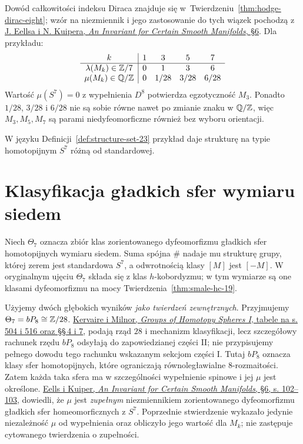 Dowód całkowitości indeksu Diraca znajduje się
w~Twierdzeniu~\ref{thm:hodge-dirac-eight};
wzór na niezmiennik i jego zastosowanie
do tych wiązek pochodzą z
\href{https://webhomes.maths.ed.ac.uk/~v1ranick/papers/eelskuip.pdf}
{J. Eellsa i N. Kuipera,
\emph{An Invariant for Certain Smooth
Manifolds}, §6}. Dla przykładu:
\[
\begin{array}{c|cccc}
 k&1&3&5&7\\ \hline
 \lambda(M_k)\in\mathbb{Z}/7&0&1&3&6\\
 \mu(M_k)\in\mathbb{Q}/\mathbb{Z}&0&1/28&3/28&6/28
\end{array}
\]
Wartość $\mu(S^7)=0$ z wypełnienia
$D^8$ potwierdza egzotyczność $M_3$.
Ponadto $1/28$, $3/28$ i $6/28$
nie są sobie równe nawet po zmianie
znaku w $\mathbb{Q}/\mathbb{Z}$, więc $M_3,M_5,M_7$
są parami niedyfeomorficzne również
bez wyboru orientacji.

W języku
Definicji~\ref{def:structure-set-23}
przykład daje strukturę na
typie homotopijnym $S^7$
różną od standardowej.

\section{Klasyfikacja gładkich sfer
 wymiaru siedem}

Niech $\Theta_7$ oznacza zbiór klas
zorientowanego dyfeomorfizmu
gładkich sfer homotopijnych wymiaru
siedem. Suma spójna $\#$ nadaje mu
strukturę grupy, której zerem jest
standardowa $S^7$, a odwrotnością
klasy $[M]$ jest $[-M]$.
W oryginalnym ujęciu $\Theta_7$ składa
się z klas $h$-kobordyzmu; w tym
wymiarze są one klasami dyfeomorfizmu
na mocy Twierdzenia~\ref{thm:smale-hc-19}.

Użyjemy dwóch głębokich wyników
\emph{jako twierdzeń zewnętrznych}.
Przyjmujemy $\Theta_7=bP_8\cong\mathbb{Z}/28$.
\href{https://www.sas.rochester.edu/mth/sites/doug-ravenel/otherpapers/kervaire-milnor.pdf}
{Kervaire i Milnor, \emph{Groups of Homotopy
Spheres I}, tabele na s. 504 i 516 oraz \S\S\,4 i 7},
podają rząd $28$ i mechanizm klasyfikacji, lecz
szczegółowy rachunek rzędu $bP_8$ odsyłają do
zapowiedzianej części II; nie przypisujemy pełnego
dowodu tego rachunku wskazanym sekcjom części I.
Tutaj
$bP_8$ oznacza klasy sfer homotopijnych,
które ograniczają równoległawialne
$8$-rozmaitości. Zatem każda taka
sfera ma w szczególności wypełnienie
spinowe i jej $\mu$ jest określone.
\href{https://webhomes.maths.ed.ac.uk/~v1ranick/papers/eelskuip.pdf}
{Eells i Kuiper, \emph{An Invariant for
Certain Smooth Manifolds}, \S6,
s. 102--103}, dowiedli, że $\mu$ jest
\emph{zupełnym} niezmiennikiem
zorientowanego dyfeomorfizmu
gładkich sfer homeomorficznych z $S^7$.
Poprzednie stwierdzenie wykazało
jedynie niezależność $\mu$ od
wypełnienia oraz obliczyło jego
wartość dla $M_k$; nie zastępuje
cytowanego twierdzenia o zupełności.

